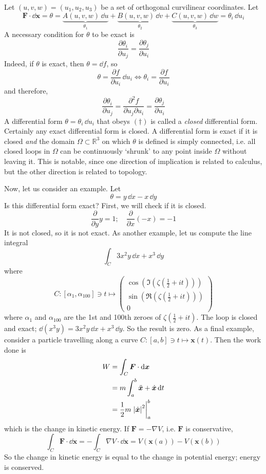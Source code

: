 \documentclass{article}
\begin{document}
Let $(u, v, w) = (u_1, u_2, u_3)$ be a set of orthogonal curvilinear coordinates. Let
\[ \bm F \cdot \dd \bm x = \theta = \underbrace{A(u, v, w) \, \dd u}_{\theta_1} + \underbrace{B(u, v, w) \, \dd v}_{\theta_2} + \underbrace{C(u, v, w) \, \dd w}_{\theta_3} = \theta_i \,\dd u_i \]
A necessary condition for $\theta$ to be exact is
\begin{equation}
    \frac{\partial \theta_i}{\partial u_j} = \frac{\partial \theta_j}{\partial u_i}
    \tag{$\dagger$}
\end{equation}
Indeed, if $\theta$ is exact, then $\theta = \dd f$, so
\[ \theta = \frac{\partial f}{\partial u_i} \, \dd u_i \iff \theta_i = \frac{\partial f}{\partial u_i} \]
and therefore,
\[ \frac{\partial \theta_i}{\partial u_j} = \frac{\partial^2 f}{\partial u_j \partial u_i} = \frac{\partial \theta_j}{\partial u_i} \]
A differential form $\theta = \theta_i \, \dd u_i$ that obeys $(\dagger)$ is called a \textit{closed} differential form. Certainly any exact differential form is closed. A differential form is exact if it is closed \textit{and} the domain $\Omega \subset \mathbb R^3$ on which $\theta$ is defined is simply connected, i.e. all closed loops in $\Omega$ can be continuously `shrunk' to any point inside $\Omega$ without leaving it. This is notable, since one direction of implication is related to calculus, but the other direction is related to topology.

Now, let us consider an example. Let
\[ \theta = y \,\dd x - x \,\dd y \]
Is this differential form exact? First, we will check if it is closed.
\[ \frac{\partial}{\partial y} y = 1;\quad \frac{\partial}{\partial x} (-x) = -1 \]
It is not closed, so it is not exact. As another example, let us compute the line integral
\[ \int_C 3x^2y\,\dd x + x^3\,\dd y \]
where
\[ C \colon [\alpha_1, \alpha_{100}] \ni t \mapsto \begin{pmatrix}
        \cos \left( \Im \left( \zeta \left( \frac{1}{2} + it \right) \right) \right) \\
        \sin \left( \Re \left( \zeta \left( \frac{1}{2} + it \right) \right) \right) \\
        0
    \end{pmatrix} \]
where $\alpha_1$ and $\alpha_{100}$ are the 1st and 100th zeroes of $\zeta \left( \frac{1}{2} + it \right)$. The loop is closed and exact; $\dd(x^3 y) = 3x^2 y \,\dd x + x^3 \, \dd y$. So the result is zero. As a final example, consider a particle travelling along a curve $C \colon [a, b] \ni t \mapsto \bm x(t)$. Then the work done is
\begin{align*}
    W & = \int_C \bm F \cdot \dd \bm x                   \\
      & = m \int_a^b \ddot{\bm x} + \dot{\bm x} \, \dd t \\
      & = \frac{1}{2}m \eval{\abs{\dot{\bm x}}^2}_a^b
\end{align*}
which is the change in kinetic energy. If $\bm F = -\nabla V$, i.e. $\bm F$ is conservative,
\[ \int_C \bm F \cdot \dd \bm x = -\int_C \nabla V \cdot \dd \bm x = V(\bm x(a)) - V(\bm x(b)) \]
So the change in kinetic energy is equal to the change in potential energy; energy is conserved.
\end{document}

